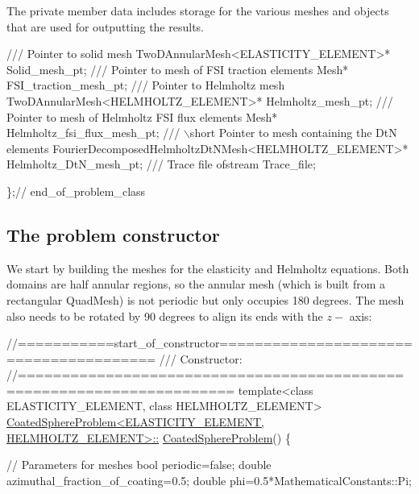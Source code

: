 The private member data includes storage for the various meshes and objects that are used for outputting the results.


\begin{DoxyCodeInclude}
\textcolor{comment}{}
\textcolor{comment}{ /// Pointer to solid mesh}
\textcolor{comment}{} TwoDAnnularMesh<ELASTICITY\_ELEMENT>* Solid\_mesh\_pt;
\textcolor{comment}{}
\textcolor{comment}{ /// Pointer to mesh of FSI traction elements}
\textcolor{comment}{} Mesh* FSI\_traction\_mesh\_pt;
\textcolor{comment}{}
\textcolor{comment}{ /// Pointer to Helmholtz mesh}
\textcolor{comment}{} TwoDAnnularMesh<HELMHOLTZ\_ELEMENT>* Helmholtz\_mesh\_pt;
\textcolor{comment}{}
\textcolor{comment}{ /// Pointer to mesh of Helmholtz FSI flux elements}
\textcolor{comment}{} Mesh* Helmholtz\_fsi\_flux\_mesh\_pt;
 \textcolor{comment}{}
\textcolor{comment}{ /// \(\backslash\)short Pointer to mesh containing the DtN elements}
\textcolor{comment}{} FourierDecomposedHelmholtzDtNMesh<HELMHOLTZ\_ELEMENT>* Helmholtz\_DtN\_mesh\_pt;
 \textcolor{comment}{}
\textcolor{comment}{ /// Trace file}
\textcolor{comment}{} ofstream Trace\_file;

\};\textcolor{comment}{// end\_of\_problem\_class}

\end{DoxyCodeInclude}




 

\hypertarget{index_constr}{}\subsection{The problem constructor}\label{index_constr}
We start by building the meshes for the elasticity and Helmholtz equations. Both domains are half annular regions, so the annular mesh (which is built from a rectangular {\ttfamily Quad\+Mesh}) is not periodic but only occupies 180 degrees. The mesh also needs to be rotated by 90 degrees to align its ends with the $ z- $ axis\+:

 
\begin{DoxyCodeInclude}
\textcolor{comment}{//===========start\_of\_constructor======================================= }
\textcolor{comment}{/// Constructor: }
\textcolor{comment}{}\textcolor{comment}{//====================================================================== }
\textcolor{keyword}{template}<\textcolor{keyword}{class} ELASTICITY\_ELEMENT, \textcolor{keyword}{class} HELMHOLTZ\_ELEMENT>
\hyperlink{classCoatedSphereProblem_ab9c983e7f0bed66f13d59bd65d6d151b}{CoatedSphereProblem<ELASTICITY\_ELEMENT, HELMHOLTZ\_ELEMENT>::}
\hyperlink{classCoatedSphereProblem_ab9c983e7f0bed66f13d59bd65d6d151b}{CoatedSphereProblem}() 
\{

 \textcolor{comment}{// Parameters for meshes}
 \textcolor{keywordtype}{bool} periodic=\textcolor{keyword}{false};
 \textcolor{keywordtype}{double} azimuthal\_fraction\_of\_coating=0.5;
 \textcolor{keywordtype}{double} phi=0.5*MathematicalConstants::Pi;

\end{DoxyCodeInclude}


